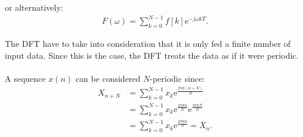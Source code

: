 or alternatively:
\begin{align*}
	F(\omega) = \sum_{k=0}^{N-1}f[k]\text{e}^{-j\omega k T}.
\end{align*}


The DFT have to take into consideration that it is only fed a finite number of input data. Since this is the case, the DFT treats the data as if it were periodic.
\\ \\
A sequence $x(n)$ can be considered $N$-periodic since:
\begin{align*}
	X_{n+N}
	&= \sum_{k=0}^{N-1} x_k \text{e}^{\frac{2 \pi k (n+N)}{N}}		\\
	&= \sum_{k=0}^{N-1} x_k \text{e}^{\frac{2 \pi k n}{N}}			\text{e}^{\frac{2 \pi k N}{N}} \\
	&= \sum_{k=0}^{N-1} x_k \text{e}^{\frac{2 \pi k n}{N}} = 		X_n.
\end{align*}

